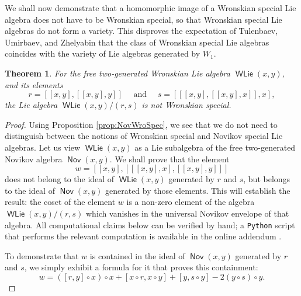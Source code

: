 \documentclass[11pt,reqno]{amsart}
\theoremstyle{plain}
\newtheorem{theorem}{Theorem}[section]
\theoremstyle{definition}
\theoremstyle{remark}
\DeclareMathOperator{\Nov}{\mathsf{Nov}}
\DeclareMathOperator{\WLie}{\mathsf{WLie}}
\begin{document}
We shall now demonstrate that a homomorphic image of a Wronskian special Lie algebra does not have to be Wronskian special, so that Wronskian special Lie algebras do not form a variety. This disproves the expectation of Tulenbaev, Umirbaev, and Zhelyabin \cite[Conj.~2]{MR4556333} that the class of Wronskian special Lie algebras coincides with the variety of Lie algebras generated by $W_1$.

\begin{theorem}\label{thm:exceptional}
For the free two-generated Wronskian Lie algebra $\WLie(x,y)$, and its elements
 \[
r=[[x,y],[[x,y],y]] \quad \text{ and } \quad  s=[[[x,y],[[x,y],x]],x],   
 \]
the Lie algebra $\WLie(x,y)/(r,s)$ is not Wronskian special.
\end{theorem}

\begin{proof}
Using Proposition \ref{prop:NovWroSpec}, we see that we do not need to distinguish between the notions of Wronskian special and Novikov special Lie algebras. Let us view $\WLie(x,y)$ as a Lie subalgebra of the free two-generated Novikov algebra $\Nov(x,y)$. 
We shall prove that the element 
\[
 w=[[x,y],[[[x,y],x],[[x,y],y]]]
\]
does not belong to the ideal of $\WLie(x,y)$ generated by $r$ and $s$, but belongs to the ideal of $\Nov(x,y)$ generated by those elements. This will establish the result: the coset of the element $w$ is a non-zero element of the algebra $\WLie(x,y)/(r,s)$ which vanishes in the universal Novikov envelope of that algebra. All computational claims below can be verified by hand; a \texttt{Python} script that performs the relevant computation is available in the online addendum \cite{addendum}.

To demonstrate that $w$ is contained in the ideal of $\Nov(x,y)$ generated by $r$ and $s$, we simply exhibit a formula for it that proves this containment:
\begin{equation}\label{id: w in J and L}
 w=([r,y]\circ x)\circ x+[x\circ r,x\circ y] +[y,s\circ y]-2(y\circ s)\circ y.
\end{equation} 


\end{proof}
\end{document}
